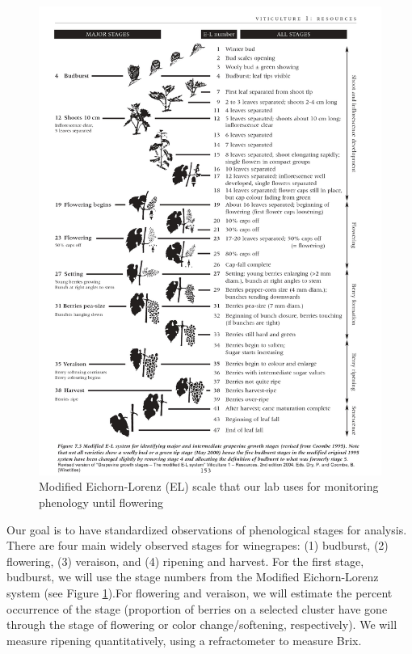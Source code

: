 \documentclass[11pt,letter]{article}
\begin{document}
\begin{figure}
  \includegraphics[width=\linewidth]{ELScale.jpg}
  \caption{ Modified Eichorn-Lorenz (EL) scale that our lab uses for monitoring phenology until flowering }
  \label{fig:ELScale}
\end{figure}

Our goal is to have standardized observations of phenological stages for analysis. There are four main widely observed stages for winegrapes: (1) budburst, (2) flowering, (3) veraison, and (4) ripening and harvest. For the first stage, budburst, we will use the stage numbers from the Modified Eichorn-Lorenz system (see Figure \ref{fig:ELScale}).For flowering and veraison, we will estimate the percent occurrence of the stage (proportion of berries on a selected cluster have gone through the stage of flowering or color change/softening, respectively). We will measure ripening quantitatively, using a refractometer to measure Brix.
\end{document}
